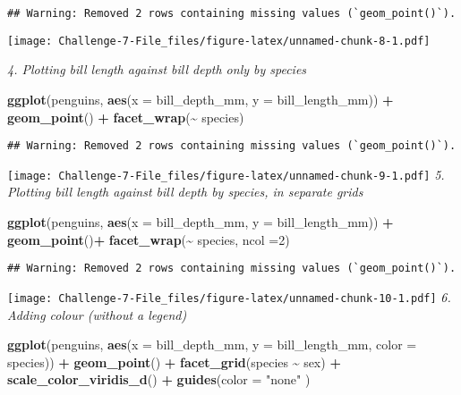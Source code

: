 \documentclass[
]{article}
\newenvironment{Shaded}{\begin{snugshade}}{\end{snugshade}}
\newcommand{\AttributeTok}[1]{\textcolor[rgb]{0.13,0.29,0.53}{#1}}
\newcommand{\DecValTok}[1]{\textcolor[rgb]{0.00,0.00,0.81}{#1}}
\newcommand{\FunctionTok}[1]{\textcolor[rgb]{0.13,0.29,0.53}{\textbf{#1}}}
\newcommand{\NormalTok}[1]{#1}
\newcommand{\SpecialCharTok}[1]{\textcolor[rgb]{0.81,0.36,0.00}{\textbf{#1}}}
\newcommand{\StringTok}[1]{\textcolor[rgb]{0.31,0.60,0.02}{#1}}
\begin{document}
\begin{verbatim}
## Warning: Removed 2 rows containing missing values (`geom_point()`).
\end{verbatim}

\texttt{[image: Challenge-7-File\_files/figure-latex/unnamed-chunk-8-1.pdf]}

\emph{4. Plotting bill length against bill depth only by species}

\begin{Shaded}
\begin{Highlighting}[]
\FunctionTok{ggplot}\NormalTok{(penguins, }\FunctionTok{aes}\NormalTok{(}\AttributeTok{x =}\NormalTok{ bill\_depth\_mm, }\AttributeTok{y =}\NormalTok{ bill\_length\_mm)) }\SpecialCharTok{+} \FunctionTok{geom\_point}\NormalTok{() }\SpecialCharTok{+}
\FunctionTok{facet\_wrap}\NormalTok{(}\SpecialCharTok{\textasciitilde{}}\NormalTok{ species)}
\end{Highlighting}
\end{Shaded}

\begin{verbatim}
## Warning: Removed 2 rows containing missing values (`geom_point()`).
\end{verbatim}

\texttt{[image: Challenge-7-File\_files/figure-latex/unnamed-chunk-9-1.pdf]}
\emph{5. Plotting bill length against bill depth by species, in separate
grids}

\begin{Shaded}
\begin{Highlighting}[]
\FunctionTok{ggplot}\NormalTok{(penguins, }\FunctionTok{aes}\NormalTok{(}\AttributeTok{x =}\NormalTok{ bill\_depth\_mm, }\AttributeTok{y =}\NormalTok{ bill\_length\_mm)) }\SpecialCharTok{+} \FunctionTok{geom\_point}\NormalTok{()}\SpecialCharTok{+}
\FunctionTok{facet\_wrap}\NormalTok{(}\SpecialCharTok{\textasciitilde{}}\NormalTok{ species, }\AttributeTok{ncol =}\DecValTok{2}\NormalTok{)}
\end{Highlighting}
\end{Shaded}

\begin{verbatim}
## Warning: Removed 2 rows containing missing values (`geom_point()`).
\end{verbatim}

\texttt{[image: Challenge-7-File\_files/figure-latex/unnamed-chunk-10-1.pdf]}
\emph{6. Adding colour (without a legend)}

\begin{Shaded}
\begin{Highlighting}[]
\FunctionTok{ggplot}\NormalTok{(penguins, }\FunctionTok{aes}\NormalTok{(}\AttributeTok{x =}\NormalTok{ bill\_depth\_mm, }\AttributeTok{y =}\NormalTok{ bill\_length\_mm, }\AttributeTok{color =}\NormalTok{ species)) }\SpecialCharTok{+}
\FunctionTok{geom\_point}\NormalTok{() }\SpecialCharTok{+} \FunctionTok{facet\_grid}\NormalTok{(species }\SpecialCharTok{\textasciitilde{}}\NormalTok{ sex) }\SpecialCharTok{+} \FunctionTok{scale\_color\_viridis\_d}\NormalTok{() }\SpecialCharTok{+}
\FunctionTok{guides}\NormalTok{(}\AttributeTok{color =}
\StringTok{"none"}
\NormalTok{)}
\end{Highlighting}
\end{Shaded}
\end{document}
